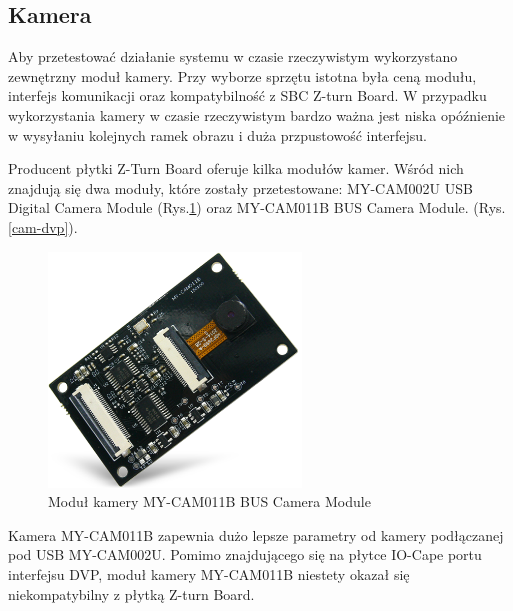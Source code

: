\subsection{Kamera}

Aby przetestować działanie systemu w czasie rzeczywistym wykorzystano zewnętrzny 
moduł kamery. Przy wyborze sprzętu istotna była ceną modułu, interfejs komunikacji
oraz kompatybilność z SBC Z-turn Board. W przypadku wykorzystania kamery w czasie 
rzeczywistym bardzo ważna jest niska opóźnienie w wysyłaniu kolejnych ramek obrazu 
i duża przpustowość interfejsu. 

Producent płytki Z-Turn Board oferuje kilka modułów kamer. Wśród nich znajdują się dwa moduły, które zostały przetestowane: MY-CAM002U USB Digital Camera Module (Rys.\ref{cam-usb}) oraz MY-CAM011B BUS Camera Module. (Rys. \ref{cam-dvp}).
  
\begin{figure}[!h]
    \centering
    \includegraphics[width=0.6\textwidth]{img/my-cam011b.png}
    \caption{Moduł kamery MY-CAM011B BUS Camera Module}
    \label{cam-usb}
  \end{figure}

Kamera MY-CAM011B zapewnia dużo lepsze parametry od kamery podłączanej pod USB 
MY-CAM002U. Pomimo znajdującego się na płytce IO-Cape portu interfejsu DVP, moduł kamery MY-CAM011B niestety okazał się niekompatybilny z płytką Z-turn Board. 

